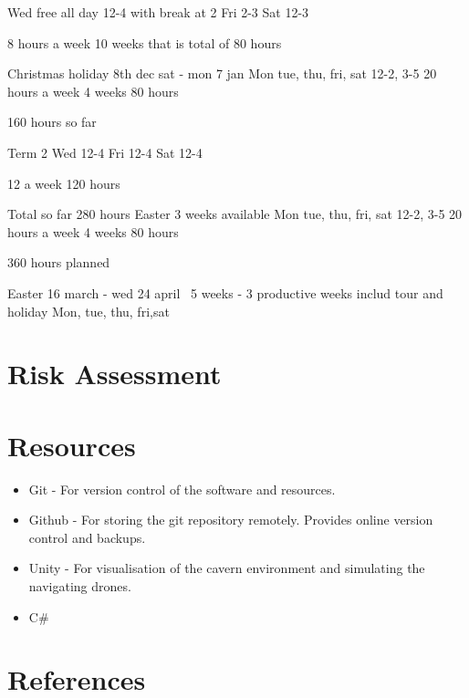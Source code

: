 \documentclass{article}
\begin{document}
Wed free all day
12-4 with break at 2
Fri 2-3
Sat 12-3

8 hours a week
10 weeks that is total of 80 hours

Christmas holiday 8th dec sat - mon 7 jan
Mon tue, thu, fri, sat 12-2, 3-5
20 hours a week 
4 weeks
80 hours

160 hours so far

Term 2
Wed 12-4
Fri 12-4
Sat 12-4

12 a week
120 hours

Total so far 280 hours 
Easter
3 weeks available
Mon tue, thu, fri, sat 12-2, 3-5
20 hours a week 
4 weeks
80 hours

360 hours planned

Easter 16 march - wed 24 april 
~5 weeks - 3 productive weeks includ tour and holiday
Mon, tue, thu, fri,sat





\section{Risk Assessment}

\section{Resources}

\begin{itemize}
    \item Git - For version control of the software and resources.
    \item Github - For storing the git repository remotely. Provides online version control and backups.
    \item Unity - For visualisation of the cavern environment and simulating the navigating drones.
    \item C#
\end{itemize}

\section{References}
\end{document}
